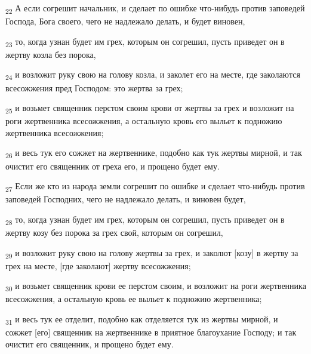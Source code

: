\begin{tcolorbox}
\textsubscript{22} А если согрешит начальник, и сделает по ошибке что-нибудь против заповедей Господа, Бога своего, чего не надлежало делать, и будет виновен,
\end{tcolorbox}
\begin{tcolorbox}
\textsubscript{23} то, когда узнан будет им грех, которым он согрешил, пусть приведет он в жертву козла без порока,
\end{tcolorbox}
\begin{tcolorbox}
\textsubscript{24} и возложит руку свою на голову козла, и заколет его на месте, где заколаются всесожжения пред Господом: это жертва за грех;
\end{tcolorbox}
\begin{tcolorbox}
\textsubscript{25} и возьмет священник перстом своим крови от жертвы за грех и возложит на роги жертвенника всесожжения, а остальную кровь его выльет к подножию жертвенника всесожжения;
\end{tcolorbox}
\begin{tcolorbox}
\textsubscript{26} и весь тук его сожжет на жертвеннике, подобно как тук жертвы мирной, и так очистит его священник от греха его, и прощено будет ему.
\end{tcolorbox}
\begin{tcolorbox}
\textsubscript{27} Если же кто из народа земли согрешит по ошибке и сделает что-нибудь против заповедей Господних, чего не надлежало делать, и виновен будет,
\end{tcolorbox}
\begin{tcolorbox}
\textsubscript{28} то, когда узнан будет им грех, которым он согрешил, пусть приведет он в жертву козу без порока за грех свой, которым он согрешил,
\end{tcolorbox}
\begin{tcolorbox}
\textsubscript{29} и возложит руку свою на голову жертвы за грех, и заколют [козу] в жертву за грех на месте, [где заколают] жертву всесожжения;
\end{tcolorbox}
\begin{tcolorbox}
\textsubscript{30} и возьмет священник крови ее перстом своим, и возложит на роги жертвенника всесожжения, а остальную кровь ее выльет к подножию жертвенника;
\end{tcolorbox}
\begin{tcolorbox}
\textsubscript{31} и весь тук ее отделит, подобно как отделяется тук из жертвы мирной, и сожжет [его] священник на жертвеннике в приятное благоухание Господу; и так очистит его священник, и прощено будет ему.
\end{tcolorbox}
